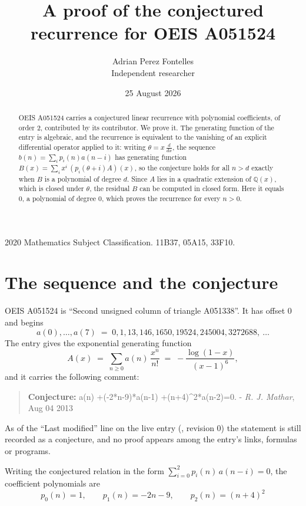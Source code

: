 \documentclass[11pt,a4paper]{article}
\title{A proof of the conjectured recurrence for OEIS A051524}
\author{Adrian Perez Fontelles\\ \small Independent researcher}
\date{25 August 2026}
\theoremstyle{plain}
\theoremstyle{definition}
\begin{document}
\maketitle

\begin{abstract}
OEIS A051524 carries a conjectured linear recurrence with polynomial coefficients, of
order 2, contributed by its contributor. We prove it. The generating function of the
entry is algebraic, and the recurrence is equivalent to the vanishing of an explicit
differential operator applied to it: writing $\theta=x\,\frac{d}{dx}$, the sequence
$b(n)=\sum_{i}p_{i}(n)a(n-i)$ has generating function
$B(x)=\sum_{i}x^{i}\,(p_{i}(\theta+i)A)(x)$, so the conjecture holds for all $n>d$ exactly
when $B$ is a polynomial of degree $d$. Since $A$ lies in a quadratic extension of
$\mathbb{Q}(x)$, which is closed under $\theta$, the residual $B$ can be computed in
closed form. Here it equals $0$, a polynomial of degree $0$, which proves
the recurrence for every $n>0$.
\end{abstract}

\noindent\small 2020 Mathematics Subject Classification. 11B37, 05A15, 33F10.\normalsize

\section{The sequence and the conjecture}

OEIS A051524 is ``Second unsigned column of triangle A051338''. It has offset $0$ and begins
\[
a(0),\dots,a(7)\;=\;0, 1, 13, 146, 1650, 19524, 245004, 3272688,\ \dots
\]
The entry gives the exponential generating function
\begin{equation}\label{eq:gf}
A(x)\;=\;\sum_{n\ge 0} a(n)\,\frac{x^{n}}{n!}\;=\;- \frac{\log{\left(1 - x \right)}}{\left(x - 1\right)^{6}} ,
\end{equation}
and it carries the following comment:
\begin{quote}\small
\textbf{Conjecture:} a(n) +(-2*n-9)*a(n-1) +(n+4)\^{}2*a(n-2)=0. - \emph{R. J. Mathar}, Aug 04 2013
\end{quote}
As of the ``Last modified'' line on the live entry (, revision 0) the
statement is still recorded as a conjecture, and no proof appears among the entry's links,
formulas or programs.

Writing the conjectured relation in the form $\sum_{i=0}^{2}p_{i}(n)\,a(n-i)=0$,
the coefficient polynomials are
\[
p_{0}(n)=1,\qquad p_{1}(n)=- 2 n - 9,\qquad p_{2}(n)=\left(n + 4\right)^{2}
\]
\end{document}
